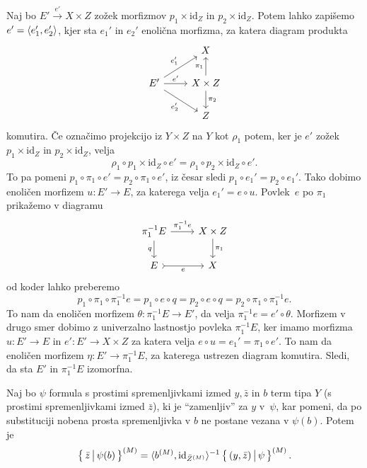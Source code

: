 \documentclass[../kategoricna_logika.tex]{subfiles}
\begin{document}
  \begin{dokaz}
    Naj bo $E' \xrightarrow{e'} X \times Z$ zožek morfizmov
    $p_1 \times \mathrm{id}_Z$ in $p_2 \times \mathrm{id}_Z$. Potem
    lahko zapišemo $e' = \langle e'_1, e'_2 \rangle$, kjer sta $e_1'$ in
    $e_2'$ enolična morfizma, za katera diagram produkta
    \begin{equation*}
      \begin{tikzcd}[row sep = normal]
        & X \\
        E' \ar[ur, "e_1'"] \ar[r, "e'"] \ar[dr, "e_2'"'] & X \times Z
        \ar[u, "\pi_1"] \ar[d, "\pi_2"] \\
        & Z
      \end{tikzcd}
    \end{equation*}
    komutira. Če označimo projekcijo iz $Y \times Z$ na $Y$ kot
    $\rho_1$ potem, ker je $e'$ zožek $p_1 \times \mathrm{id}_Z$ in
    $p_2 \times \mathrm{id}_Z$, velja
    \[ \rho_1 \circ p_1 \times \mathrm{id}_Z \circ e' = \rho_1 \circ
      p_2 \times \mathrm{id}_Z \circ e'.\] To pa pomeni
    $p_1 \circ \pi_1 \circ e' = p_2 \circ \pi_1 \circ e'$, iz česar
    sledi $p_1 \circ e_1' = p_2 \circ e_1'$. Tako dobimo enoličen
    morfizem $u : E' \to E$, za katerega velja $e_1' = e \circ
    u$. Povlek~$e$ po $\pi_1$ prikažemo v diagramu
    \begin{equation*}
      \begin{tikzcd}
        \pi_1^{-1}E \ar[d, "q"'] \ar[r, "\pi_1^{-1}e"] & X \times Z \ar[d, "\pi_1"] \\
        E \ar[r, tail, "e"'] & X
      \end{tikzcd}
    \end{equation*}
    od koder lahko preberemo
    \[ p_1 \circ \pi_1 \circ \pi_1^{-1}e = p_1 \circ e \circ q = p_2
      \circ e \circ q = p_2 \circ \pi_1 \circ \pi_1^{-1}e.\] To nam da
    enoličen morfizem $\theta : \pi_1^{-1}E \to E'$, da velja
    $\pi_1^{-1}e = e' \circ \theta$.  Morfizem v drugo smer dobimo z
    univerzalno lastnostjo povleka $\pi_1^{-1}E$, ker imamo morfizma
    $u : E' \to E$ in $e' : E' \to X \times Z$ za katera velja
    $e \circ u = e_1' = \pi_1 \circ e'$. To nam da enoličen morfizem
    $\eta : E' \to \pi_1^{-1}E$, za katerega ustrezen diagram
    komutira.  Sledi, da sta $E'$ in $\pi_1^{-1}E$ izomorfna.
  \end{dokaz}
  \begin{lema}\label{lema:substitucija}
    Naj bo $\psi$ formula s prostimi spremenljivkami izmed
    $y, \bar{z}$ in $b$ term tipa $Y$ (s prostimi spremenljivkami
    izmed $\bar{z}$), ki je "`zamenljiv"' za $y$ v~$\psi$, kar pomeni,
    da po substituciji nobena prosta spremenljivka v $b$ ne postane
    vezana v $\psi(b)$.  Potem je
  $$\left\lbrace\,\bar{z} \,\middle|\, \psi(b)\,\right\rbrace^{(M)} =
  \langle b^{(M)}, \mathrm{id}_{{\bar{Z}}^{(M)}}\rangle^{-1} \left\lbrace\,(y,
    \bar{z}) \,\middle|\, \psi\,\right\rbrace^{(M)}.$$
\end{lema}
\end{document}
